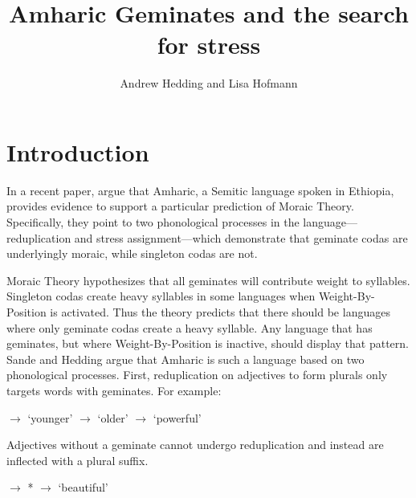 \documentclass[12pt]{article}
\title{Amharic Geminates and the search for stress}
\author{Andrew Hedding and Lisa Hofmann}
\begin{document}
\maketitle
\section{Introduction}

In a recent paper, \cite{sande-hedding14} argue that Amharic, a Semitic language spoken in Ethiopia, provides evidence to support a particular prediction of Moraic Theory. Specifically, they point to two phonological processes in the language---reduplication and stress assignment---which demonstrate that geminate codas are underlyingly moraic, while singleton codas are not. 

Moraic Theory hypothesizes that all geminates will contribute weight to syllables. Singleton codas create heavy syllables in some languages when Weight-By-Position is activated. Thus the theory predicts that there should be languages where only geminate codas create a heavy syllable. Any language that has geminates, but where Weight-By-Position is inactive, should display that pattern. Sande and Hedding argue that Amharic is such a language based on two phonological processes. First, reduplication on adjectives to form plurals only targets words with geminates. For example:

\begin{exe}
\begin{xlist}
\ex 	{} $\rightarrow$  \hspace{1cm} `younger'
\ex 	{} $\rightarrow$  \hspace{1.18cm} `older'
\ex 	{} $\rightarrow$  \hspace{1.37cm} `powerful'
\end{xlist}
\end{exe}

Adjectives without a geminate cannot undergo reduplication and instead are inflected with a plural suffix. 

\begin{exe}
\begin{xlist}
\ex 	{} $\rightarrow$ * 
\ex 	{} $\rightarrow$  \hspace{1cm} `beautiful'
\end{xlist}
\end{exe}
\end{document}
